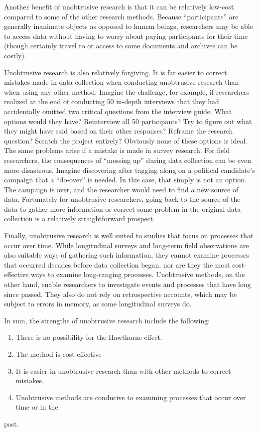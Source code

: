 Another benefit of unobtrusive research is that it can be relatively low-cost compared to some of the other research methods. Because ``participants'' are generally inanimate objects as opposed to human beings, researchers may be able to access data without having to worry about paying participants for their time (though certainly travel to or access to some documents and archives can be costly).

Unobtrusive research is also relatively forgiving. It is far easier to correct mistakes made in data collection when conducting unobtrusive research than when using any other method. Imagine the challenge, for example, if researchers realized at the end of conducting 50 in-depth interviews that they had accidentally omitted two critical questions from the interview guide. What options would they have? Reinterview all 50 participants? Try to figure out what they might have said based on their other responses? Reframe the research question? Scratch the project entirely? Obviously none of these options is ideal. The same problems arise if a mistake is made in survey research. For field researchers, the consequences of ``messing up'' during data collection can be even more disastrous. Imagine discovering after tagging along on a political candidate's campaign that a ``do-over'' is needed. In this case, that simply is not an option. The campaign is over, and the researcher would need to find a new source of data. Fortunately for unobtrusive researchers, going back to the source of the data to gather more information or correct some problem in the original data collection is a relatively straightforward prospect.

Finally, unobtrusive research is well suited to studies that focus on processes that occur over time. While longitudinal surveys and long-term field observations are also suitable ways of gathering such information, they cannot examine processes that occurred decades before data collection began, nor are they the most cost-effective ways to examine long-ranging processes. Unobtrusive methods, on the other hand, enable researchers to investigate events and processes that have long since passed. They also do not rely on retrospective accounts, which may be subject to errors in memory, as some longitudinal surveys do.

In sum, the strengths of unobtrusive research include the following:

\begin{enumerate}
	\item There is no possibility for the Hawthorne effect.
	\item The method is cost effective
	\item It is easier in unobtrusive research than with other methods to correct mistakes.
	\item Unobtrusive methods are conducive to examining processes that occur over time or in the 
\end{enumerate}past.

